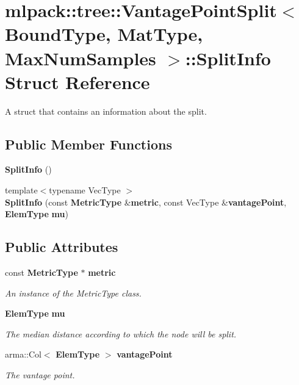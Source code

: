 \section{mlpack\+:\+:tree\+:\+:Vantage\+Point\+Split$<$ Bound\+Type, Mat\+Type, Max\+Num\+Samples $>$\+:\+:Split\+Info Struct Reference}
\label{structmlpack_1_1tree_1_1VantagePointSplit_1_1SplitInfo}


A struct that contains an information about the split.  


\subsection*{Public Member Functions}
\begin{DoxyCompactItemize}
\item 
{\bf Split\+Info} ()
\item 
{\footnotesize template$<$typename Vec\+Type $>$ }\\{\bf Split\+Info} (const {\bf Metric\+Type} \&{\bf metric}, const Vec\+Type \&{\bf vantage\+Point}, {\bf Elem\+Type} {\bf mu})
\end{DoxyCompactItemize}
\subsection*{Public Attributes}
\begin{DoxyCompactItemize}
\item 
const {\bf Metric\+Type} $\ast$ {\bf metric}
\begin{DoxyCompactList}\small\item\em An instance of the Metric\+Type class. \end{DoxyCompactList}\item 
{\bf Elem\+Type} {\bf mu}
\begin{DoxyCompactList}\small\item\em The median distance according to which the node will be split. \end{DoxyCompactList}\item 
arma\+::\+Col$<$ {\bf Elem\+Type} $>$ {\bf vantage\+Point}
\begin{DoxyCompactList}\small\item\em The vantage point. \end{DoxyCompactList}\end{DoxyCompactItemize}



